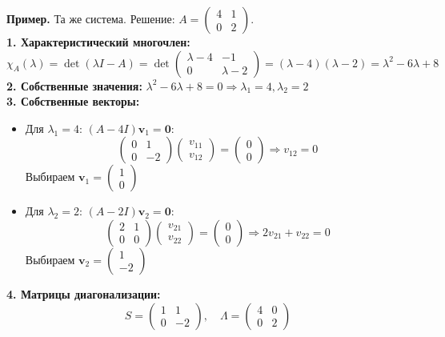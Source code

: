 \textbf{Пример.} Та же система. Решение: \; $A = \begin{pmatrix} 4 & 1 \\ 0 & 2 \end{pmatrix}$.\\
\textbf{1. Характеристический многочлен:}
$$\chi_A(\lambda) = \det(\lambda I - A) = \det\begin{pmatrix} \lambda-4 & -1 \\ 0 & \lambda-2 \end{pmatrix} = (\lambda-4)(\lambda-2) = \lambda^2 - 6\lambda + 8$$
\textbf{2. Собственные значения:} $\lambda^2 - 6\lambda + 8 = 0 \Rightarrow \lambda_1 = 4, \lambda_2 = 2$\\
\textbf{3. Собственные векторы:}
\begin{itemize}
\item Для $\lambda_1 = 4$: $(A - 4I)\mathbf{v}_1 = \mathbf{0}$:
$$\begin{pmatrix} 0 & 1 \\ 0 & -2 \end{pmatrix}\begin{pmatrix} v_{11} \\ v_{12} \end{pmatrix} = \begin{pmatrix} 0 \\ 0 \end{pmatrix} \Rightarrow v_{12} = 0$$
Выбираем $\mathbf{v}_1 = \begin{pmatrix} 1 \\ 0 \end{pmatrix}$
\item Для $\lambda_2 = 2$: $(A - 2I)\mathbf{v}_2 = \mathbf{0}$:
$$\begin{pmatrix} 2 & 1 \\ 0 & 0 \end{pmatrix}\begin{pmatrix} v_{21} \\ v_{22} \end{pmatrix} = \begin{pmatrix} 0 \\ 0 \end{pmatrix} \Rightarrow 2v_{21} + v_{22} = 0$$
Выбираем $\mathbf{v}_2 = \begin{pmatrix} 1 \\ -2 \end{pmatrix}$
\end{itemize}
\textbf{4. Матрицы диагонализации:}
$$S = \begin{pmatrix} 1 & 1 \\ 0 & -2 \end{pmatrix}, \quad \Lambda = \begin{pmatrix} 4 & 0 \\ 0 & 2 \end{pmatrix}$$
